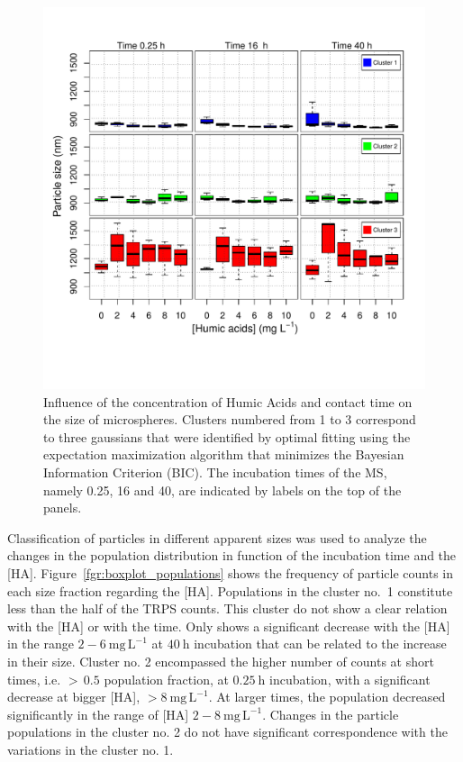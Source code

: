 \documentclass[journal=langd5,manuscript=article]{achemso}
\begin{document}
 \begin{figure}
  \includegraphics[width=0.8\linewidth]{Figures/Boxplot_MS_HA_CaCl2_sizes_rev.pdf}
  \caption{Influence of the concentration of Humic Acids and contact time on the  size of microspheres.  Clusters numbered from 1 to 3 correspond to three gaussians that were identified by optimal fitting using the expectation maximization algorithm  that minimizes the Bayesian Information Criterion (BIC). The incubation times of the MS,  namely 0.25, 16 and 40, are indicated by labels on the top of the panels.}
  \label{fgr:boxplot_size}
\end{figure}

Classification of particles in different apparent sizes was used to analyze the changes in the population distribution in function of the incubation time and the [HA]. Figure~\ref{fgr:boxplot_populations} shows the frequency of particle counts in each size fraction regarding the [HA]. %
Populations in the cluster no.~1 constitute less than the half of the TRPS counts. This cluster do not show a clear relation with the [HA] or with the time. Only  shows a  significant decrease with the [HA] in the range $2-6~\mathrm{mg\,L^{-1}}$ at $40~\mathrm{h}$ incubation that can be related to the increase in their size.
Cluster no. 2 encompassed the higher number of counts at short times, i.e. $>\,0.5$ population fraction, at $0.25~\mathrm{h}$ incubation, with a significant decrease at bigger [HA], $>8~\mathrm{mg\,L^{-1}}$. At larger times, the population decreased significantly in the range of [HA] $2-8~\mathrm{mg\,L^{-1}}$. Changes in the particle populations in the cluster no. 2 do not have significant correspondence  with the variations in the cluster no. 1.%
\end{document}
